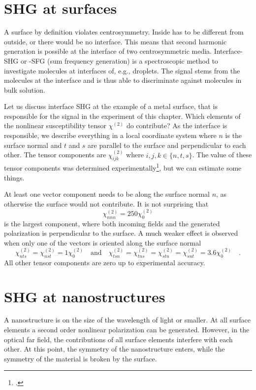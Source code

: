 \section{SHG at surfaces}

A surface by definition violates centrosymmetry. Inside has to be different from outside, or there would be no interface. This means that second harmonic generation is possible at the interface of two centrosymmetric media. Interface-SHG or -SFG (sum frequency generation) is a spectroscopic method to investigate molecules at interfaces of, e.g., droplets. The signal stems from the molecules at the interface and is thus able to discriminate against molecules in bulk solution.


Let us discuss interface SHG at the example of a metal surface, that is responsible for the signal in the experiment of this chapter. Which elements of the nonlinear susceptibility tensor $\chi^{(2)}$  do contribute? As the interface is responsible, we describe everything in a local coordinate system where $n$ is the surface normal and $t$  and $s$ are parallel to the surface and perpendicular to each other. The tensor components are $\chi^{(2)}_{ijk}$ where $  i,j,k  \in \{n , t, s \}$. The  value of these tensor components was determined experimentally\footcite{Makitalo11_OE,Wang09_prb}, but we can estimate some things.

At least one vector component needs to be along the surface normal $n$, as otherwise the surface would not contribute. It is not surprising that 
\begin{equation}
\chi^{(2)}_{nnn} = 250 \chi^{(2)}_0
\end{equation}
 is the largest component, where both incoming fields and the generated polarization is perpendicular to the surface. A much weaker effect is observed when only one of the vectors is oriented along the surface normal 
\begin{equation}
\chi^{(2)}_{nts} = \chi^{(2)}_{nst} = 1 \chi^{(2)}_0 \quad \text{and} \quad
\chi^{(2)}_{tsn} = \chi^{(2)}_{tns} = \chi^{(2)}_{stn} = \chi^{(2)}_{snt}= 3.6 \chi^{(2)}_0 \quad.
\end{equation}
All other tensor components are zero up to experimental accuracy.


\section{SHG at nanostructures}

A nanostructure is on the size of the wavelength of light or smaller. At all surface elements a second order nonlinear polarization can be generated. However, in the optical far field, the contributions of all surface elements interfere with each other. At this point, the symmetry of the nanostructure enters, while the symmetry of the material is broken by the surface.

